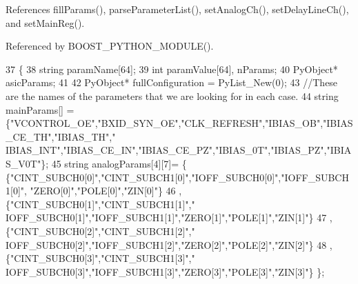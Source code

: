 References fill\+Params(), parse\+Parameter\+List(), set\+Analog\+Ch(), set\+Delay\+Line\+Ch(), and set\+Main\+Reg().



Referenced by B\+O\+O\+S\+T\+\_\+\+P\+Y\+T\+H\+O\+N\+\_\+\+M\+O\+D\+U\+L\+E().


\begin{DoxyCode}
37 \{
38     \textcolor{keywordtype}{string} paramName[64];
39     \textcolor{keywordtype}{int} paramValue[64], nParams;
40     PyObject* asicParams;
41 
42     PyObject* fullConfiguration = PyList\_New(0);
43     \textcolor{comment}{//These are the names of the parameters that we are looking for in each case.}
44     \textcolor{keywordtype}{string} mainParams[] = \{\textcolor{stringliteral}{"VCONTROL\_OE"},\textcolor{stringliteral}{"BXID\_SYN\_OE"},\textcolor{stringliteral}{"CLK\_REFRESH"},\textcolor{stringliteral}{"IBIAS\_OB"},\textcolor{stringliteral}{"IBIAS\_CE\_TH"},\textcolor{stringliteral}{"IBIAS\_TH"},\textcolor{stringliteral}{"
      IBIAS\_INT"},\textcolor{stringliteral}{"IBIAS\_CE\_IN"},\textcolor{stringliteral}{"IBIAS\_CE\_PZ"},\textcolor{stringliteral}{"IBIAS\_0T"},\textcolor{stringliteral}{"IBIAS\_PZ"},\textcolor{stringliteral}{"IBIAS\_V0T"}\};
45     \textcolor{keywordtype}{string} analogParams[4][7]=      \{ \{\textcolor{stringliteral}{"CINT\_SUBCH0[0]"},\textcolor{stringliteral}{"CINT\_SUBCH1[0]"},\textcolor{stringliteral}{"IOFF\_SUBCH0[0]"},\textcolor{stringliteral}{"IOFF\_SUBCH1[0]"},\textcolor{stringliteral}{
      "ZERO[0]"},\textcolor{stringliteral}{"POLE[0]"},\textcolor{stringliteral}{"ZIN[0]"}\}
46                                                                 , \{\textcolor{stringliteral}{"CINT\_SUBCH0[1]"},\textcolor{stringliteral}{"CINT\_SUBCH1[1]"},\textcolor{stringliteral}{"
      IOFF\_SUBCH0[1]"},\textcolor{stringliteral}{"IOFF\_SUBCH1[1]"},\textcolor{stringliteral}{"ZERO[1]"},\textcolor{stringliteral}{"POLE[1]"},\textcolor{stringliteral}{"ZIN[1]"}\}
47                                                                 , \{\textcolor{stringliteral}{"CINT\_SUBCH0[2]"},\textcolor{stringliteral}{"CINT\_SUBCH1[2]"},\textcolor{stringliteral}{"
      IOFF\_SUBCH0[2]"},\textcolor{stringliteral}{"IOFF\_SUBCH1[2]"},\textcolor{stringliteral}{"ZERO[2]"},\textcolor{stringliteral}{"POLE[2]"},\textcolor{stringliteral}{"ZIN[2]"}\}
48                                                                 , \{\textcolor{stringliteral}{"CINT\_SUBCH0[3]"},\textcolor{stringliteral}{"CINT\_SUBCH1[3]"},\textcolor{stringliteral}{"
      IOFF\_SUBCH0[3]"},\textcolor{stringliteral}{"IOFF\_SUBCH1[3]"},\textcolor{stringliteral}{"ZERO[3]"},\textcolor{stringliteral}{"POLE[3]"},\textcolor{stringliteral}{"ZIN[3]"}\}             \};

\end{DoxyCode}
